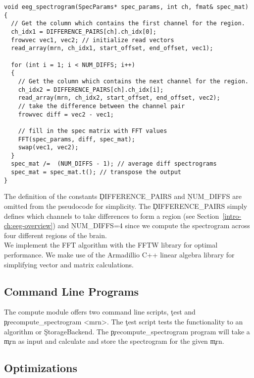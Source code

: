 \begin{lstlisting}
void eeg_spectrogram(SpecParams* spec_params, int ch, fmat& spec_mat)
{
  // Get the column which contains the first channel for the region.
  ch_idx1 = DIFFERENCE_PAIRS[ch].ch_idx[0];
  frowvec vec1, vec2; // initialize read vectors
  read_array(mrn, ch_idx1, start_offset, end_offset, vec1);

  for (int i = 1; i < NUM_DIFFS; i++)
  {
    // Get the column which contains the next channel for the region.
    ch_idx2 = DIFFERENCE_PAIRS[ch].ch_idx[i];
    read_array(mrn, ch_idx2, start_offset, end_offset, vec2);
    // take the difference between the channel pair
    frowvec diff = vec2 - vec1;

    // fill in the spec matrix with FFT values
    FFT(spec_params, diff, spec_mat);
    swap(vec1, vec2);
  }
  spec_mat /=  (NUM_DIFFS - 1); // average diff spectrograms
  spec_mat = spec_mat.t(); // transpose the output
}
\end{lstlisting}

The definition of the constants \c{DIFFERENCE\_PAIRS} and \c{NUM\_DIFFS} are
omitted from the pseudocode for simplicity. The \c{DIFFERENCE\_PAIRS} simply
defines which channels to take differences to form a region (see
Section~\ref{intro-ch:eeg-overview}) and \c{NUM\_DIFFS=4} since we
compute the spectrogram across four different regions of the brain. \\

We implement the FFT algorithm with the FFTW library \cite{fftw} for optimal
performance. We make use of the Armadillio C++ linear algebra library
\cite{arma} for simplifying vector and matrix calculations.

\subsection{Command Line Programs}\label{compute-ch:implementation-cmd}

The compute module offers two command line scripts, \c{test} and
\c{precompute\_spectrogram <mrn>}. The \c{test} script tests the functionality
to an algorithm or \c{StorageBackend}. The \c{precompute\_spectrogram} program
will take a \c{mrn} as input and calculate and store the spectrogram for the
given \c{mrn}.

\subsection{Optimizations}

